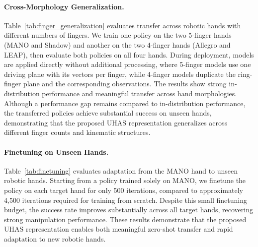 \vspace{-2mm}
\paragraph{Cross-Morphology Generalization.}
Table~\ref{tab:finger_generalization} evaluates transfer across robotic hands with different numbers of fingers. We train one policy on the two 5-finger hands (MANO and Shadow) and another on the two 4-finger hands (Allegro and LEAP), then evaluate both policies on all four hands. During deployment, models are applied directly without additional processing, where 5-finger models use one driving plane with its vectors per finger, while 4-finger models duplicate the ring-finger plane and the corresponding observations. The results show strong in-distribution performance and meaningful transfer across hand morphologies. Although a performance gap remains compared to in-distribution performance, the transferred policies achieve substantial success on unseen hands, demonstrating that the proposed UHAS representation generalizes across different finger counts and kinematic structures.

\vspace{-2mm}
\paragraph{Finetuning on Unseen Hands.}
Table~\ref{tab:finetuning} evaluates adaptation from the MANO hand to unseen robotic hands. Starting from a policy trained solely on MANO, we finetune the policy on each target hand for only 500 iterations, compared to approximately 4,500 iterations required for training from scratch. Despite this small finetuning budget, the success rate improves substantially across all target hands, recovering strong manipulation performance. These results demonstrate that the proposed UHAS representation enables both meaningful zero-shot transfer and rapid adaptation to new robotic hands.
 




